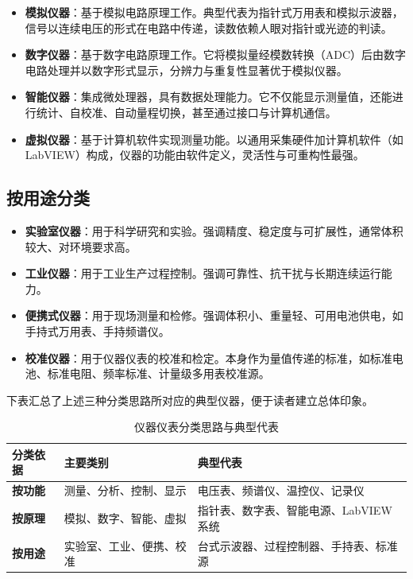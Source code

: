 \begin{itemize}
    \item \textbf{模拟仪器}：基于模拟电路原理工作。典型代表为指针式万用表和模拟示波器，信号以连续电压的形式在电路中传递，读数依赖人眼对指针或光迹的判读。
    \item \textbf{数字仪器}：基于数字电路原理工作。它将模拟量经模数转换（ADC）后由数字电路处理并以数字形式显示，分辨力与重复性显著优于模拟仪器。
    \item \textbf{智能仪器}：集成微处理器，具有数据处理能力。它不仅能显示测量值，还能进行统计、自校准、自动量程切换，甚至通过接口与计算机通信。
    \item \textbf{虚拟仪器}：基于计算机软件实现测量功能。以通用采集硬件加计算机软件（如 LabVIEW）构成，仪器的功能由软件定义，灵活性与可重构性最强。
\end{itemize}

\subsection{按用途分类}

\begin{itemize}
    \item \textbf{实验室仪器}：用于科学研究和实验。强调精度、稳定度与可扩展性，通常体积较大、对环境要求高。
    \item \textbf{工业仪器}：用于工业生产过程控制。强调可靠性、抗干扰与长期连续运行能力。
    \item \textbf{便携式仪器}：用于现场测量和检修。强调体积小、重量轻、可用电池供电，如手持式万用表、手持频谱仪。
    \item \textbf{校准仪器}：用于仪器仪表的校准和检定。本身作为量值传递的标准，如标准电池、标准电阻、频率标准、计量级多用表校准源。
\end{itemize}

下表汇总了上述三种分类思路所对应的典型仪器，便于读者建立总体印象。

\begin{table}[htbp]
    \centering
    \caption{仪器仪表分类思路与典型代表}
    \begin{tabular}{|p{3.2cm}|p{5.5cm}|p{5.5cm}|}
        \hline
        \textbf{分类依据} & \textbf{主要类别} & \textbf{典型代表} \\
        \hline
        \textbf{按功能} & 测量、分析、控制、显示 & 电压表、频谱仪、温控仪、记录仪 \\
        \hline
        \textbf{按原理} & 模拟、数字、智能、虚拟 & 指针表、数字表、智能电源、LabVIEW 系统 \\
        \hline
        \textbf{按用途} & 实验室、工业、便携、校准 & 台式示波器、过程控制器、手持表、标准源 \\
        \hline
    \end{tabular}
\end{table}


